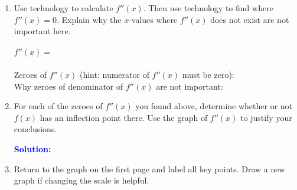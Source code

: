 \documentclass[letterpaper,11pt]{article}
\newcommand{\sol}[2]{\begin{minipage}[c][#1]{\linewidth}{\textcolor{blue}{\textbf{Solution:}}\quad \textcolor{blue}{#2}}\end{minipage}}
\newcommand{\sol}[2]{\begin{minipage}[c][#1]{\linewidth}{\vfill}\end{minipage}}
\begin{document}
\begin{enumerate}
\item  Use technology to calculate $f''(x)$. Then use technology to find where $f''(x)=0$. Explain why the $x$-values where $f''(x)$ does not exist are not important here.\\\\
$f''(x)=$\\\\
Zeroes of $f''(x)$ (hint: numerator of $f''(x)$ must be zero):\\

Why zeroes of denominator of $f''(x)$ are not important:\\
\item  For each of the zeroes of $f''(x)$ you found above, determine whether or not $f(x)$ has an inflection point there. Use the graph of $f''(x)$ to justify your conclusions.

\sol{1.5in}{}
\vfill
\item Return to the graph on the first page and label all key points. Draw a new graph if changing the scale is helpful.


\end{enumerate}
\end{document}
